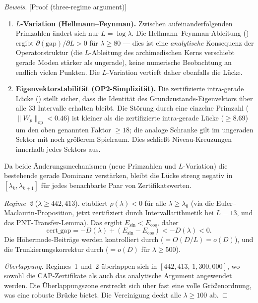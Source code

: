 \documentclass[12pt,a4paper]{article}
\theoremstyle{definition}
\theoremstyle{remark}
\begin{document}
\begin{proof}[Beweis][Proof (three-regime argument)]
\begin{enumerate}[label=(\roman*)]
  \item \textbf{$L$-Variation (Hellmann--Feynman).}
    Zwischen aufeinanderfolgenden Primzahlen ändert sich nur $L = \log\lambda$.
    Die Hellmann--Feynman-Ableitung () ergibt $\partial(\mathrm{gap})/\partial L > 0$ für $\lambda \geq 80$ --- dies ist eine \emph{analytische} Konsequenz der Operatorstruktur (die $L$-Ableitung des archimedischen Kerns verschiebt gerade Moden stärker als ungerade), keine numerische Beobachtung an endlich vielen Punkten.
    Die $L$-Variation vertieft daher ebenfalls die Lücke.

  \item \textbf{Eigenvektorstabilität (OP2-Simplizität).}
    Die zertifizierte intra-gerade Lücke () stellt sicher, dass die Identität des Grundzustands-Eigenvektors über alle $33$ Intervalle erhalten bleibt.
    Die Störung durch eine einzelne Primzahl ($\|W_p\|_{\mathrm{op}} < 0.46$) ist kleiner als die zertifizierte intra-gerade Lücke ($\geq 8.69$) um den oben genannten Faktor $\geq 18$; die analoge Schranke gilt im ungeraden Sektor mit noch größerem Spielraum.
    Dies schließt Niveau-Kreuzungen innerhalb jedes Sektors aus.
\end{enumerate}

\noindent Da beide Änderungsmechanismen (neue Primzahlen und $L$-Variation) die bestehende gerade Dominanz verstärken, bleibt die Lücke streng negativ in $[\lambda_k, \lambda_{k+1}]$ für jedes benachbarte Paar von Zertifikatswerten.

\emph{Regime~2} ($\lambda \geq 442{,}413$).  etabliert $\rho(\lambda) < 0$ für alle $\lambda \geq \lambda_0$ (via die Euler--Maclaurin-Proposition, jetzt zertifiziert durch Intervallarithmetik bei $L = 13$, und das PNT-Transfer-Lemma). Das ergibt $E_{\sin} < E_{\cos}$, daher
\[
  \mathrm{cert\_gap} = -D(\lambda) + (E_{\sin} - E_{\cos}) < -D(\lambda) < 0.
\]
Die Höhermode-Beiträge werden kontrolliert durch  ($= O(D/L) = o(D)$), und die Trunkierungskorrektur durch  ($= o(D)$ für $\lambda \geq 500$).

\emph{Überlappung.} Regimes~1 und~2 überlappen sich in $[442{,}413,\, 1{,}300{,}000]$, wo sowohl die CAP-Zertifikate als auch das analytische Argument angewendet werden. Die Überlappungszone erstreckt sich über fast eine volle Größenordnung, was eine robuste Brücke bietet. Die Vereinigung deckt alle $\lambda \geq 100$ ab.
\end{proof}
\end{document}

